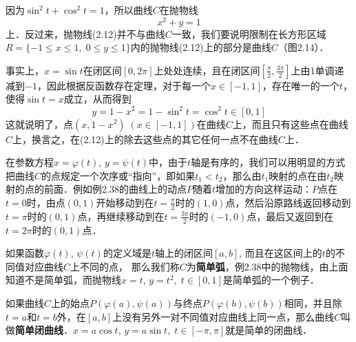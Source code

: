 \begin{solution}
因为$\sin^2 t+\cos^2 t=1 $，所以曲线$C$在抛物线
\begin{equation}
    x^2+y=1
\end{equation}
上．反过来，抛物线(2.12)并不与曲线$C$一致，我们要说明限制在长方形区域$R=\{-1\le x\le 1,\; 0\le y\le 1\}$内的抛物线(2.12)上的部分是曲线$C$（图2.14）．

\begin{figure}[htp]
    \centering
{}
    \caption{}
\end{figure}

事实上，$x=\sin t$在闭区间$[0,2\pi]$上处处连续，且在闭区间$\left[\frac{\pi}{2},\frac{3\pi}{2}\right]$上由1单调递减到$-1$，因此根据反函数存在定理，对于每一个$x\in[-1,1]$，存在唯一的一个$t$，使得$\sin t=x$成立，从而得到
\[y=1-x^2=1-\sin^2 t=\cos^2 t\in [0,1]\]
这就说明了，点$(x,1-x^2)\; (x\in [-1, 1])$在曲线$C$上，而且只有这些点在曲线$C$上，换言之，在(2.12)上的除去这些点的其它任何一点不在曲线$C$上．
\end{solution}

在参数方程$x=\varphi(t)$, $y=\psi(t)$中，由于$t$轴是有序的，我们可以用明显的方式把曲线$C$的点规定一个次序或“指向”，即如果$t_1<t_2$，那么由$t_1$映射的点在由$t_2$映射的点的前面．例如例2.38的曲线上的动点$P$随着$t$增加的方向这样运动：$P$点在$t=0$时，由点$(0,1)$开始移动到在$t=\frac{\pi}{2}$时的$(1,0)$点，然后沿原路线返回移动到$t=\pi$时的$(0,1)$点，再继续移动到在$t=\frac{3\pi}{2}$时的$(-1, 0)$点，最后又返回到在$t=2\pi$时的$(0, 1)$点．

如果函数$\varphi(t)$, $\psi(t)$的定义域是$t$轴上的闭区间$[a,b]$, 而且在这区间上的$t$的不同值对应曲线$C$上不同的点，
那么我们称$C$为\textbf{简单弧}，例2.38中的抛物线，由上面知道不是简单弧，而抛物线$x=t$, $y=t^2,\; t\in [0, 1]$是简单弧的一个例子．

如果曲线$C$上的始点$P(\varphi(a),\psi(a))$与终点$P(\varphi(b),\psi(b))$相同，并且除$t=a$和$t=b$外，在$[a,b]$上没有另外一对不同值对应曲线上同一点，那么曲线$C$叫做\textbf{简单闭曲线}．$x=a\cos t$, $y=a\sin t,\; t\in [-\pi,\pi]$就是简单的闭曲线．

